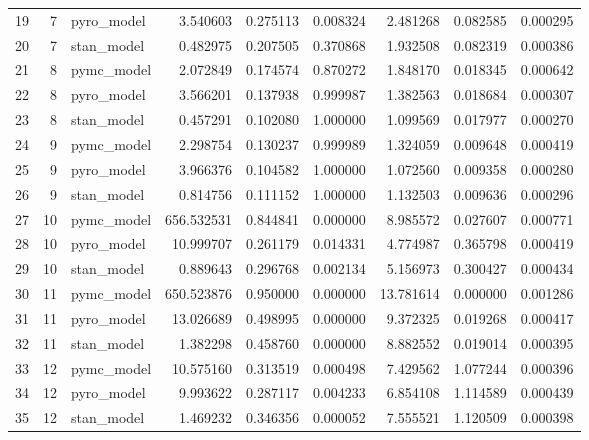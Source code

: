 \begin{tabular}{lrlrrrrrr}
19 & 7 & pyro_model & 3.540603 & 0.275113 & 0.008324 & 2.481268 & 0.082585 & 0.000295 \\
20 & 7 & stan_model & 0.482975 & 0.207505 & 0.370868 & 1.932508 & 0.082319 & 0.000386 \\
21 & 8 & pymc_model & 2.072849 & 0.174574 & 0.870272 & 1.848170 & 0.018345 & 0.000642 \\
22 & 8 & pyro_model & 3.566201 & 0.137938 & 0.999987 & 1.382563 & 0.018684 & 0.000307 \\
23 & 8 & stan_model & 0.457291 & 0.102080 & 1.000000 & 1.099569 & 0.017977 & 0.000270 \\
24 & 9 & pymc_model & 2.298754 & 0.130237 & 0.999989 & 1.324059 & 0.009648 & 0.000419 \\
25 & 9 & pyro_model & 3.966376 & 0.104582 & 1.000000 & 1.072560 & 0.009358 & 0.000280 \\
26 & 9 & stan_model & 0.814756 & 0.111152 & 1.000000 & 1.132503 & 0.009636 & 0.000296 \\
27 & 10 & pymc_model & 656.532531 & 0.844841 & 0.000000 & 8.985572 & 0.027607 & 0.000771 \\
28 & 10 & pyro_model & 10.999707 & 0.261179 & 0.014331 & 4.774987 & 0.365798 & 0.000419 \\
29 & 10 & stan_model & 0.889643 & 0.296768 & 0.002134 & 5.156973 & 0.300427 & 0.000434 \\
30 & 11 & pymc_model & 650.523876 & 0.950000 & 0.000000 & 13.781614 & 0.000000 & 0.001286 \\
31 & 11 & pyro_model & 13.026689 & 0.498995 & 0.000000 & 9.372325 & 0.019268 & 0.000417 \\
32 & 11 & stan_model & 1.382298 & 0.458760 & 0.000000 & 8.882552 & 0.019014 & 0.000395 \\
33 & 12 & pymc_model & 10.575160 & 0.313519 & 0.000498 & 7.429562 & 1.077244 & 0.000396 \\
34 & 12 & pyro_model & 9.993622 & 0.287117 & 0.004233 & 6.854108 & 1.114589 & 0.000439 \\
35 & 12 & stan_model & 1.469232 & 0.346356 & 0.000052 & 7.555521 & 1.120509 & 0.000398 \\
\bottomrule
\end{tabular}
